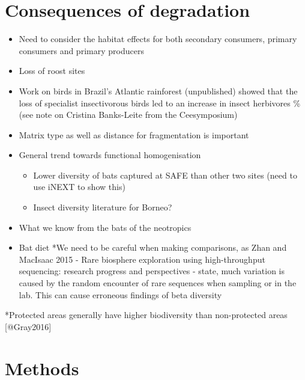 \documentclass[]{article}
\providecommand{\tightlist}{%
  \setlength{\itemsep}{0pt}\setlength{\parskip}{0pt}}
\begin{document}
\section{Consequences of degradation}\label{consequences-of-degradation}

\begin{itemize}
\tightlist
\item
  Need to consider the habitat effects for both secondary consumers,
  primary consumers and primary producers
\item
  Loss of roost sites
\item
  Work on birds in Brazil's Atlantic rainforest (unpublished) showed
  that the loss of specialist insectivorous birds led to an increase in
  insect herbivores \%(see note on Cristina Banks-Leite from the
  Ceesymposium)
\item
  Matrix type as well as distance for fragmentation is important
\item
  General trend towards functional homogenisation

  \begin{itemize}
  \tightlist
  \item
    Lower diversity of bats captured at SAFE than other two sites (need
    to use iNEXT to show this)
  \item
    Insect diversity literature for Borneo?
  \end{itemize}
\item
  What we know from the bats of the neotropics
\item
  Bat diet *We need to be careful when making comparisons, as Zhan and
  MacIsaac 2015 - Rare biosphere exploration using high-throughput
  sequencing: research progress and perspectives - state, much variation
  is caused by the random encounter of rare sequences when sampling or
  in the lab. This can cause erroneous findings of beta diversity
\end{itemize}

*Protected areas generally have higher biodiversity than non-protected
areas {[}@Gray2016{]}

\section{Methods}\label{methods}
\end{document}
